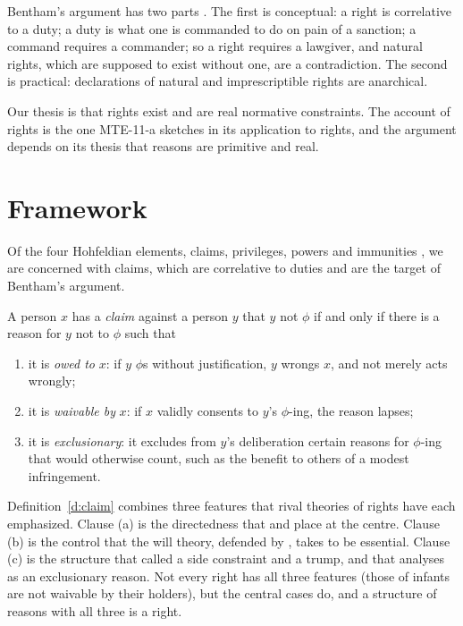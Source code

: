 \documentclass{situationist-preprint}
\begin{document}
Bentham's argument has two parts \citep{Waldron1987}. The first is conceptual: a right is correlative to a duty; a duty is what one is commanded to do on pain of a sanction; a command requires a commander; so a right requires a lawgiver, and natural rights, which are supposed to exist without one, are a contradiction. The second is practical: declarations of natural and imprescriptible rights are anarchical.

Our thesis is that rights exist and are real normative constraints. The account of rights is the one MTE-11-a sketches in its application to rights, and the argument depends on its thesis that reasons are primitive and real.

\section{Framework}

Of the four Hohfeldian elements, claims, privileges, powers and immunities \citep{Hohfeld1919}, we are concerned with claims, which are correlative to duties and are the target of Bentham's argument.

\begin{definition}\label{d:claim}
A person $x$ has a \emph{claim} against a person $y$ that $y$ not $\phi$ if and only if there is a reason for $y$ not to $\phi$ such that
\begin{enumerate}[label=(\alph*)]
\item it is \emph{owed to} $x$: if $y$ $\phi$s without justification, $y$ wrongs $x$, and not merely acts wrongly;
\item it is \emph{waivable by} $x$: if $x$ validly consents to $y$'s $\phi$-ing, the reason lapses;
\item it is \emph{exclusionary}: it excludes from $y$'s deliberation certain reasons for $\phi$-ing that would otherwise count, such as the benefit to others of a modest infringement.
\end{enumerate}
\end{definition}

Definition~\ref{d:claim} combines three features that rival theories of rights have each emphasized. Clause (a) is the directedness that \citet[ch.~1]{Thomson1990} and \citet{Darwall2006} place at the centre. Clause (b) is the control that the will theory, defended by \citet[ch.~7]{Hart1982}, takes to be essential. Clause (c) is the structure that \citet[ch.~3]{Nozick1974} called a side constraint and \citet{Dworkin1977} a trump, and that \citet{Raz1999} analyses as an exclusionary reason. Not every right has all three features (those of infants are not waivable by their holders), but the central cases do, and a structure of reasons with all three is a right.
\end{document}
